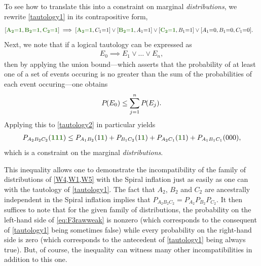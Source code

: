 \documentclass[aps,english,10pt,superscriptaddress,onecolumn,twoside,longbibliography,pra,floatfix,fleqn,nofootinbib]{revtex4-1}
\newcommand*{\mgreen}[1]{{\color{OliveGreen}{\mathbf{#1}}}}
\theoremstyle{definition}
\newcommand{\p}[2][]{{P_{#1}}\parenths{#2}}
\newcommand{\eql}{\mathord{=}}
\DeclarePairedDelimiter{\parens}{\lparen}{\rparen}
\DeclarePairedDelimiter{\parenths}{\lparen}{\rparen}
\begin{document}
To see how to translate this into a constraint on marginal {\em distributions}, we rewrite \cref{tautology1} in its contrapositive form,
\begin{align}\begin{split}\label{tautology2}
&[\mgreen{A_2 \eql 1} , \mgreen{B_2 \eql 1} , \mgreen{C_2 \eql 1}]  \implies [\mgreen{A_2 \eql 1}, C_1 \eql 1] \lor  [\mgreen{B_2 \eql 1}, A_1 \eql 1] \lor  [\mgreen{C_2 \eql 1}, B_1 \eql 1] \lor  [A_1 \eql 0, B_1 \eql 0, C_1 \eql 0].
\end{split}\end{align}
Next, we note that if a logical tautology can be expressed as
\begin{align}\label{eq:inference}
    E_0 \implies E_1 \lor \ldots \lor E_n,
\end{align}
then by applying the union bound---which asserts that the probability of at least one of a set of events occuring is no greater than the sum of the probabilities of each event occuring---one obtains
\begin{align}\label{eq:possinference}
\p{E_0}\leq \sum\limits_{j=1}^n{\p{E_j}}.
\end{align}
Applying this to \cref{tautology2} in particular yields
\begin{align}\label{eq:F3rawweak}
P_{A_2 B_2 C_2}\parens{\mgreen{1} \mgreen{1} \mgreen{1}} \leq P_{A_1 B_2}\parens{1 \mgreen{1 }}+P_{ B_1 C_2}\parens{ 1 \mgreen{1}}+P_{A_2 C_1}\parens{\mgreen{1 } 1}+P_{A_1 B_1 C_1}\parens{0 0 0},
\end{align}
which is a constraint on the marginal {\em distributions}.
 
This inequality allows one to demonstrate the incompatibility of the family of distributions of \cref{W4,W1,W5} with the Spiral inflation just as easily as one can with the tautology of \cref{tautology1}. The fact that $A_2$, $B_2$ and $C_2$ are ancestrally independent in the Spiral inflation implies that $P_{A_2 B_2 C_2} = P_{A_2} P_{B_2} P_{C_2}$. 
 It then suffices to note that for the given family of distributions, the probability on the left-hand side of \cref{eq:F3rawweak} is nonzero (which corresponds to the consequent of \cref{tautology1} being sometimes false) while every probability on the right-hand side is zero (which corresponds to the antecedent of \cref{tautology1} being always true).  But, of course, the inequality can witness many other incompatibilities in addition to this one.
\end{document}
